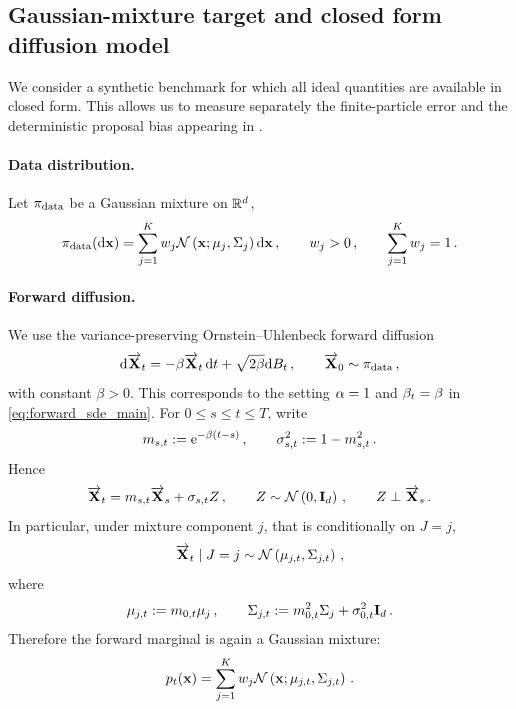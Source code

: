 \documentclass[11pt]{article}
\theoremstyle{plain}
\theoremstyle{definition}
\theoremstyle{remark}
\begin{document}
\subsection{Gaussian-mixture target and closed form diffusion model}

We consider a synthetic benchmark for which all ideal quantities are available in closed form. This allows us to measure separately the finite-particle error and the deterministic proposal bias appearing in .

\paragraph{Data distribution.}
Let $\pi_{\mathrm{data}}$ be a Gaussian mixture on $\mathbb{R}^d$,
\begin{equation}
\label{eq:num_gmm_prior}
\pidata(\rmd \x) = \sum_{j=1}^{K} w_j \gaussiand{\mu_j}{\Sigma_j}[\x] \rmd \x  \eqsp,
\qquad  w_j>0 \eqsp ,\qquad \sum_{j=1}^{K} w_j=1  \eqsp.
\end{equation}

\paragraph{Forward diffusion.}
We use the variance-preserving Ornstein--Uhlenbeck forward diffusion
\begin{equation*}
\mathrm{d} \overrightarrow{\mathbf{X}}_t = -\beta \overrightarrow{\mathbf{X}}_t\,\mathrm{d} t + \sqrt{2\beta} \mathrm{d} B_t \,, \qquad \overrightarrow{\mathbf{X}}_0\sim\pi_{\mathrm{data}} \,,
\end{equation*}
with constant $\beta>0$. This corresponds to the setting
$\alpha=1$ and $\beta_{t}=\beta$ in \eqref{eq:forward_sde_main}.
For $0\le s\le t\le T$, write
$$
m_{s,t}:= \mathrm{e}^{-\beta(t-s)} \,,
\qquad
\sigma_{s,t}^2 := 1-m_{s,t}^2 \,.
$$
Hence
\begin{equation} \label{eq:forward_marginal_view}
    \Xora_t = m_{s,t}\Xora_s + \sigma_{s,t} Z \eqsp,
    \qquad
    Z \sim \gaussiand{0}{\Id_d} \eqsp, \qquad Z \perp \Xora_s \eqsp.
\end{equation}
In particular, under mixture component $j$, that is conditionally on $J=j$, 
\begin{equation} \label{eq:Xora_knowing_J}
 \Xora_t \mid J=j \sim \gaussiand{\mu_{j,t}}{\Sigma_{j,t}} \eqsp,
\end{equation}
where 
$$
\mu_{j,t} := m_{0,t}\mu_j \,, \qquad \Sigma_{j,t} := m_{0,t}^2\Sigma_j+\sigma^2_{0,t} \mathbf{I}_d \,.
$$
Therefore the forward marginal is again a Gaussian mixture: 
\begin{equation*} %
p_t(\x) = \sum_{j=1}^{K} w_j \gaussiand{\mu_{j,t}}{\Sigma_{j,t}}[\x] \eqsp. 
\end{equation*} 
\end{document}
